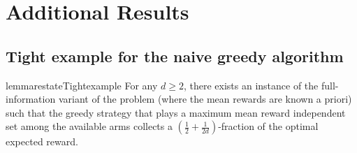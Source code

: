\section{Additional Results}

\subsection{Tight example for the naive greedy algorithm} \label{appendix:tightexample}

\begin{restatable}{lemma}{restateTightexample}\label{lem:tightexample}
For any $d \geq 2$, there exists an instance of the full-information variant of the \mbb problem (where the mean rewards are known a priori) such that the greedy strategy that plays a maximum mean reward independent set among the available arms collects a $\left(\frac{1}{2} + \frac{1}{2d}\right)$-fraction of the optimal expected reward.
\end{restatable}


